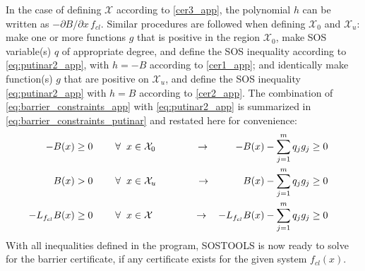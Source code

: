 In the case of defining $\mathcal{X}$ according to \autoref{cer3_app}, the polynomial $h$ can be written as $-\partial B/\partial x \, f_{cl}$.
Similar procedures are followed when defining $\mathcal{X}_0$ and $\mathcal{X}_u$: make one or more functions $g$ that is positive in the region $\mathcal{X}_0$, make SOS variable(s) $q$ of appropriate degree, and define the SOS inequality according to \autoref{eq:putinar2_app}, with $h=-B$ according to \autoref{cer1_app}; and identically make function(s) $g$ that are positive on $\mathcal{X}_u$, and define the SOS inequality \autoref{eq:putinar2_app} with $h=B$ according to \autoref{cer2_app}. The combination of \autoref{eq:barrier_constraints_app} with \autoref{eq:putinar2_app} is summarized in \autoref{eq:barrier_constraints_putinar} and restated here for convenience:
\begin{subequations}\label{eq:barrier_constraints_putinar_app}
\begin{flalign}
-B(x) &\geq 0 \hspace{0.8cm}  \forall \hspace{2mm} x \in \mathcal{X}_0 \qquad\qquad \rightarrow& 
	-B(x) - \sum _{j=1}^{m}q_jg_j &\geq 0 && \label{cer1_putinar_app}\\
B(x) &> 0 \hspace{0.8cm}  \forall \hspace{2mm} x \in \mathcal{X}_u \qquad\qquad \rightarrow& 
	B(x) - \sum _{j=1}^{m}q_jg_j &\geq 0 &&\label{cer2_putinar_app} \\
-L_{f_{cl}}B(x) &\geq 0 \hspace{0.8cm}  \forall \hspace{2mm} x \in \mathcal{X} \,\qquad\qquad \rightarrow& 
	-L_{f_{cl}}B(x) - \sum _{j=1}^{m}q_jg_j &\geq 0 && \label{cer3_putinar_app}
\end{flalign}
\end{subequations}
With all inequalities defined in the program, SOSTOOLS is now ready to solve for the barrier certificate, if any certificate exists for the given system $f_{cl}(x)$.

